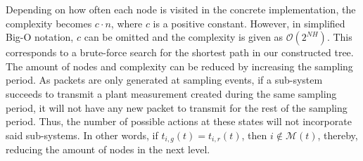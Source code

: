 Depending on how often each node is visited in the concrete implementation, the
complexity becomes $c \cdot n$, where $c$ is a positive constant. However, in
simplified Big-O notation, $c$ can be omitted and the complexity is given as
$\mathcal{O}(2^{NH})$. This corresponds to a brute-force search for the shortest
path in our constructed tree. The amount of nodes and complexity can be reduced
by increasing the sampling period. As packets are only generated at sampling
events, if a sub-system succeeds to transmit a plant measurement created during
the same sampling period, it will not have any new packet to transmit for the
rest of the sampling period. Thus, the number of possible actions at these
states will not incorporate said sub-systems. In other words, if $t_{i,g}(t) =
t_{i,r}(t)$, then $i \not \in \mathcal{M}(t)$, thereby, reducing the amount of
nodes in the next level.
